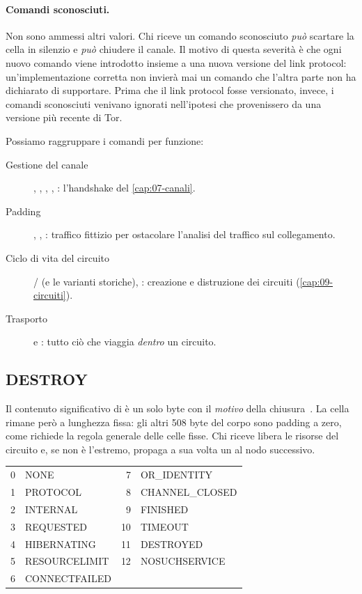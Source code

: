 \paragraph{Comandi sconosciuti.} Non sono ammessi altri valori. Chi riceve un comando sconosciuto \emph{può} scartare la cella in silenzio e \emph{può} chiudere il canale. Il motivo di questa severità è che ogni nuovo comando viene introdotto insieme a una nuova versione del link protocol: un'implementazione corretta non invierà mai un comando che l'altra parte non ha dichiarato di supportare. Prima che il link protocol fosse versionato, invece, i comandi sconosciuti venivano ignorati nell'ipotesi che provenissero da una versione più recente di Tor.

Possiamo raggruppare i comandi per funzione:
\begin{description}
  \item[Gestione del canale] , , , , : l'handshake del \cref{cap:07-canali}.
  \item[Padding] , , : traffico fittizio per ostacolare l'analisi del traffico sul collegamento.
  \item[Ciclo di vita del circuito] / (e le varianti storiche), : creazione e distruzione dei circuiti (\cref{cap:09-circuiti}).
  \item[Trasporto]  e : tutto ciò che viaggia \emph{dentro} un circuito.
\end{description}

\subsection{DESTROY}

Il contenuto significativo di  è un solo byte con il \emph{motivo} della chiusura~. La cella rimane però a lunghezza fissa: gli altri 508 byte del corpo sono padding a zero, come richiede la regola generale delle celle fisse. Chi riceve  libera le risorse del circuito e, se non è l'estremo, propaga a sua volta un  al nodo successivo.

\begin{center}\small
\begin{tabular}{rl@{\qquad}rl}
\toprule
0 & NONE & 7 & OR\_IDENTITY \\
1 & PROTOCOL & 8 & CHANNEL\_CLOSED \\
2 & INTERNAL & 9 & FINISHED \\
3 & REQUESTED & 10 & TIMEOUT \\
4 & HIBERNATING & 11 & DESTROYED \\
5 & RESOURCELIMIT & 12 & NOSUCHSERVICE \\
6 & CONNECTFAILED & & \\
\bottomrule
\end{tabular}
\end{center}

